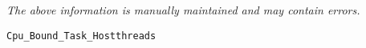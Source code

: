\label{pkg:cpu\_bound\_task\_hostthreads}

{\tiny \it The above information is manually maintained and may contain errors.}
\begin{verbatim}
Cpu_Bound_Task_Hostthreads
\end{verbatim}
